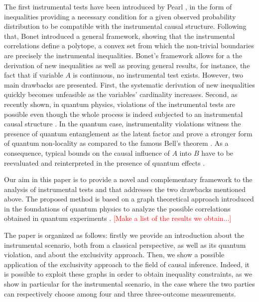\documentclass[letterpaper]{article}
\begin{document}
The first instrumental tests have been introduced by Pearl \cite{pearl1995}, in
the form of inequalities providing a necessary condition for a given observed
probability distribution to be compatible with the instrumental causal
structure. Following that, Bonet \cite{bonet2001} introduced a general
framework, showing that the instrumental correlations define a polytope, a
convex set from which the non-trivial boundaries are precisely the instrumental
inequalities. Bonet's framework allows for a the derivation of new inequalities
as well as proving general results, for instance, the fact that if variable $A$
is continuous, no instrumental test exists. However, two main drawbacks are
presented. First, the systematic derivation of new inequalities quickly becomes
unfeasible as the variables' cardinality increases. Second, as recently shown,
in quantum physics, violations of the instrumental tests are possible even
though the whole process is indeed subjected to an instrumental causal structure
\cite{chaves2018, himbeeck2018}. In the quantum case, instrumentality violations
witness the presence of quantum entanglement as the latent factor and prove a
stronger form of quantum non-locality as compared to the famous Bell's theorem
\cite{chaves2018}. As a consequence, typical bounds on the causal influence of
$A$ into $B$ have to be reevaluated and reinterpreted in the presence of quantum
effects \cite{}.

Our aim in this paper is to provide a novel and complementary framework to the
analysis of instrumental tests and that addresses the two drawbacks mentioned
above. The proposed method is based on a graph theoretical approach introduced
in the foundations of quantum physics to analyze the possible correlations
obtained in quantum experiments \cite{}. 
\textcolor{red}{[Make a list of the
results we obtain...]}

The paper is organized as follows: firstly we provide an introduction about the
instrumental scenario, both from a classical perspective, as well as its quantum
violation, and about the exclusivity approach. Then, we show a possible
application of the exclusivity approach to the field of causal inference.
Indeed, it is possible to exploit these graphs in order to obtain inequality
constraints, as we show in particular for the instrumental scenario, in the case
where the two parties can respectively choose among four and three three-outcome
measurements.
\end{document}
